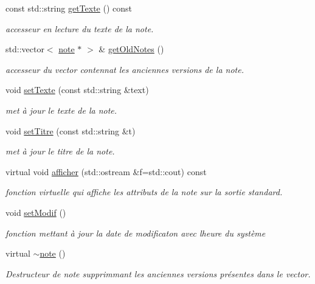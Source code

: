 \begin{DoxyCompactItemize}
\mbox{\label{classnote_a45af8038b60447374ba961a414910a49}} 
const std\+::string \hyperlink{classnote_a45af8038b60447374ba961a414910a49}{get\+Texte} () const
\begin{DoxyCompactList}\small\item\em accesseur en lecture du texte de la note. \end{DoxyCompactList}\item 
\mbox{\label{classnote_a8cfc267bcce6a99035df33e420a18f38}} 
std\+::vector$<$ \hyperlink{classnote}{note} $\ast$ $>$ \& \hyperlink{classnote_a8cfc267bcce6a99035df33e420a18f38}{get\+Old\+Notes} ()
\begin{DoxyCompactList}\small\item\em accesseur du vector contennat les anciennes versions de la note. \end{DoxyCompactList}\item 
void \hyperlink{classnote_a2895efc80041830db954a5af4b0670bf}{set\+Texte} (const std\+::string \&text)
\begin{DoxyCompactList}\small\item\em met à jour le texte de la note. \end{DoxyCompactList}\item 
void \hyperlink{classnote_a70884d3640a6f4440ddb9bd30925b5e7}{set\+Titre} (const std\+::string \&t)
\begin{DoxyCompactList}\small\item\em met à jour le titre de la note. \end{DoxyCompactList}\item 
\mbox{\label{classnote_a8fce1df255349a335517128f8e9af543}} 
virtual void \hyperlink{classnote_a8fce1df255349a335517128f8e9af543}{afficher} (std\+::ostream \&f=std\+::cout) const
\begin{DoxyCompactList}\small\item\em fonction virtuelle qui affiche les attributs de la note sur la sortie standard. \end{DoxyCompactList}\item 
\mbox{\label{classnote_ab90880ae93348a23d0f84f2c2931e0bf}} 
void \hyperlink{classnote_ab90880ae93348a23d0f84f2c2931e0bf}{set\+Modif} ()
\begin{DoxyCompactList}\small\item\em fonction mettant à jour la date de modificaton avec l\textquotesingle{}heure du système \end{DoxyCompactList}\item 
\mbox{\label{classnote_abaece2737aa27cf5efb19e75bedcc41f}} 
virtual \hyperlink{classnote_abaece2737aa27cf5efb19e75bedcc41f}{$\sim$note} ()
\begin{DoxyCompactList}\small\item\em Destructeur de note supprimmant les anciennes versions présentes dans le vector. \end{DoxyCompactList}\end{DoxyCompactItemize}
